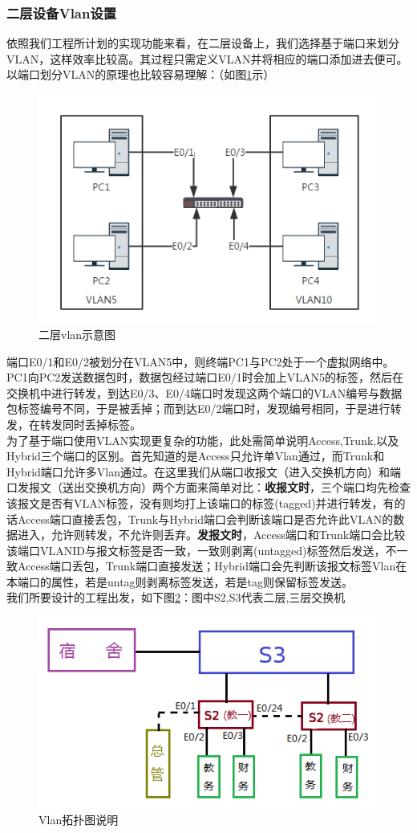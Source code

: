 	\subsubsection{二层设备Vlan设置}%
	依照我们工程所计划的实现功能来看，在二层设备上，我们选择基于端口来划分VLAN，这样效率比较高。其过程只需定义VLAN并将相应的端口添加进去便可。以端口划分VLAN的原理也比较容易理解：（如图\ref{fig:safe_1}示）\\
\begin{figure}[thbp!]
\centering
\includegraphics[width=0.7\linewidth]{figure/safe_1.png}
\caption{二层vlan示意图}
\label{fig:safe_1}
\end{figure}
\indent	端口E0/1和E0/2被划分在VLAN5中，则终端PC1与PC2处于一个虚拟网络中。PC1向PC2发送数据包时，数据包经过端口E0/1时会加上VLAN5的标签，然后在交换机中进行转发，到达E0/3、E0/4端口时发现这两个端口的VLAN编号与数据包标签编号不同，于是被丢掉；而到达E0/2端口时，发现编号相同，于是进行转发，在转发同时丢掉标签。\\
\indent	为了基于端口使用VLAN实现更复杂的功能，此处需简单说明Access,Trunk,以及Hybrid三个端口的区别。首先知道的是Access只允许单Vlan通过，而Trunk和Hybrid端口允许多Vlan通过。在这里我们从端口收报文（进入交换机方向）和端口发报文（送出交换机方向）两个方面来简单对比：\textbf{收报文时}，三个端口均先检查该报文是否有VLAN标签，没有则均打上该端口的标签(tagged)并进行转发，有的话Access端口直接丢包，Trunk与Hybrid端口会判断该端口是否允许此VLAN的数据进入，允许则转发，不允许则丢弃。\textbf{发报文时}，Access端口和Trunk端口会比较该端口VLANID与报文标签是否一致，一致则剥离(untagged)标签然后发送，不一致Access端口丢包，Trunk端口直接发送；Hybrid端口会先判断该报文标签Vlan在本端口的属性，若是untag则剥离标签发送，若是tag则保留标签发送。\\
\indent	我们所要设计的工程出发，如下图\ref{fig:safe_2}：图中S2,S3代表二层,三层交换机\\
\begin{figure}[thbp!]
\centering
\includegraphics[width=0.7\linewidth]{figure/safe_2.png}
\caption{Vlan拓扑图说明}
\label{fig:safe_2}
\end{figure}
